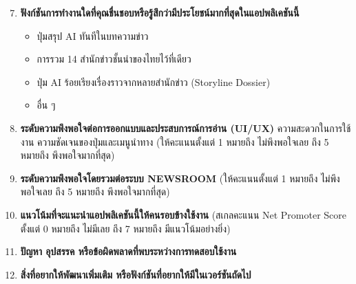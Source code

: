 \begin{enumerate}
    \setcounter{enumi}{6}
    \item \textbf{ฟังก์ชันการทำงานใดที่คุณชื่นชอบหรือรู้สึกว่ามีประโยชน์มากที่สุดในแอปพลิเคชันนี้}
    \begin{itemize}[noitemsep]
        \item[$\square$] ปุ่มสรุป AI ทันทีในบทความข่าว
        \item[$\square$] การรวม 14 สำนักข่าวชั้นนำของไทยไว้ที่เดียว
        \item[$\square$] ปุ่ม AI ร้อยเรียงเรื่องราวจากหลายสำนักข่าว (Storyline Dossier)
        \item[$\square$] อื่น ๆ
    \end{itemize}
    \item \textbf{ระดับความพึงพอใจต่อการออกแบบและประสบการณ์การอ่าน (UI/UX)} ความสะดวกในการใช้งาน ความชัดเจนของปุ่มและเมนูนำทาง (ให้คะแนนตั้งแต่ 1 หมายถึง ไม่พึงพอใจเลย ถึง 5 หมายถึง พึงพอใจมากที่สุด)
    \item \textbf{ระดับความพึงพอใจโดยรวมต่อระบบ NEWSROOM} (ให้คะแนนตั้งแต่ 1 หมายถึง ไม่พึงพอใจเลย ถึง 5 หมายถึง พึงพอใจมากที่สุด)
    \item \textbf{แนวโน้มที่จะแนะนำแอปพลิเคชันนี้ให้คนรอบข้างใช้งาน} (สเกลคะแนน Net Promoter Score ตั้งแต่ 0 หมายถึง ไม่มีเลย ถึง 7 หมายถึง มีแนวโน้มอย่างยิ่ง)
    \item \textbf{ปัญหา อุปสรรค หรือข้อผิดพลาดที่พบระหว่างการทดสอบใช้งาน}
    \begin{center}
    \framebox[\linewidth]{\rule{0pt}{0.7cm}}
    \end{center}
    \item \textbf{สิ่งที่อยากให้พัฒนาเพิ่มเติม หรือฟังก์ชันที่อยากให้มีในเวอร์ชันถัดไป}
    \begin{center}
    \framebox[\linewidth]{\rule{0pt}{0.7cm}}
    \end{center}
\end{enumerate}
